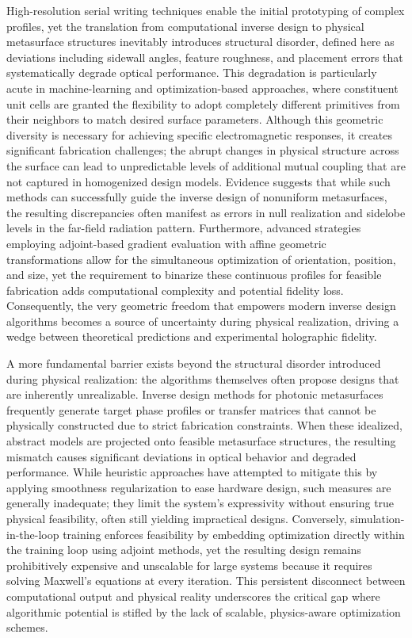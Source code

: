 High-resolution serial writing techniques enable the initial prototyping of complex profiles, yet the translation from computational inverse design to physical metasurface structures inevitably introduces structural disorder, defined here as deviations including sidewall angles, feature roughness, and placement errors that systematically degrade optical performance. This degradation is particularly acute in machine-learning and optimization-based approaches, where constituent unit cells are granted the flexibility to adopt completely different primitives from their neighbors to match desired surface parameters. Although this geometric diversity is necessary for achieving specific electromagnetic responses, it creates significant fabrication challenges; the abrupt changes in physical structure across the surface can lead to unpredictable levels of additional mutual coupling that are not captured in homogenized design models. Evidence suggests that while such methods can successfully guide the inverse design of nonuniform metasurfaces, the resulting discrepancies often manifest as errors in null realization and sidelobe levels in the far-field radiation pattern. Furthermore, advanced strategies employing adjoint-based gradient evaluation with affine geometric transformations allow for the simultaneous optimization of orientation, position, and size, yet the requirement to binarize these continuous profiles for feasible fabrication adds computational complexity and potential fidelity loss. Consequently, the very geometric freedom that empowers modern inverse design algorithms becomes a source of uncertainty during physical realization, driving a wedge between theoretical predictions and experimental holographic fidelity. \citep{doi_10_48550_arxiv_2603_15210_fdcfb92f} \citep{doi_10_1109_tap_2021_3137496_d4a1d597}

A more fundamental barrier exists beyond the structural disorder introduced during physical realization: the algorithms themselves often propose designs that are inherently unrealizable. Inverse design methods for photonic metasurfaces frequently generate target phase profiles or transfer matrices that cannot be physically constructed due to strict fabrication constraints. When these idealized, abstract models are projected onto feasible metasurface structures, the resulting mismatch causes significant deviations in optical behavior and degraded performance. While heuristic approaches have attempted to mitigate this by applying smoothness regularization to ease hardware design, such measures are generally inadequate; they limit the system's expressivity without ensuring true physical feasibility, often still yielding impractical designs. Conversely, simulation-in-the-loop training enforces feasibility by embedding optimization directly within the training loop using adjoint methods, yet the resulting design remains prohibitively expensive and unscalable for large systems because it requires solving Maxwell's equations at every iteration. This persistent disconnect between computational output and physical reality underscores the critical gap where algorithmic potential is stifled by the lack of scalable, physics-aware optimization schemes. \citep{doi_10_48550_arxiv_2505_18377_a6fc9ec3}

